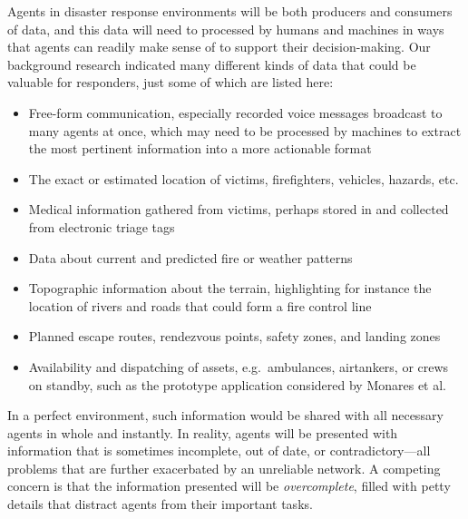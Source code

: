 \documentclass[]             %
{NASA}                       %
\theoremstyle{definition}
\begin{document}
Agents in disaster response environments will be both
producers and consumers of data, and this data will need to processed
by humans and machines in ways that agents can readily make sense of
to support their decision-making. Our background research indicated
many different kinds of data that could be valuable for
responders, just some of which are listed here:
\begin{itemize}
\item Free-form communication, especially recorded voice messages
  broadcast to many agents at once, which may need to be processed by
  machines to extract the most pertinent information into a more
  actionable format
\item The exact or estimated location of victims, firefighters,
  vehicles, hazards, etc.
\item Medical information gathered from victims, perhaps stored in and
  collected from electronic triage tags \cite{2009:triagetag}
\item Data about current and predicted fire or weather patterns
\item Topographic information about the terrain, highlighting for
  instance the location of rivers and roads that could form a fire
  control line
\item Planned escape routes, rendezvous points, safety zones, and
  landing zones
\item Availability and dispatching of assets, e.g.~ambulances,
  airtankers, or crews on standby, such as the prototype application
  considered by Monares et al. \cite{2011:monares}
\end{itemize}
In a perfect environment, such information would be shared with all
necessary agents in whole and instantly. In reality, agents will be
presented with information that is sometimes incomplete, out of date,
or contradictory---all problems that are further exacerbated by an
unreliable network. A competing concern is that the information
presented will be \emph{overcomplete}, filled with petty details that
distract agents from their important tasks.
\end{document}
